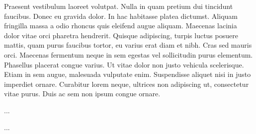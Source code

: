 \documentclass[acmtocl,acmnow]{acmtrans2m}
\begin{document}
Praesent vestibulum laoreet volutpat. Nulla in quam pretium dui tincidunt faucibus. Donec eu gravida dolor. In hac habitasse platea dictumst. Aliquam fringilla massa a odio rhoncus quis eleifend augue aliquam. Maecenas lacinia dolor vitae orci pharetra hendrerit. Quisque adipiscing, turpis luctus posuere mattis, quam purus faucibus tortor, eu varius erat diam et nibh. Cras sed mauris orci. Maecenas fermentum neque in sem egestas vel sollicitudin purus elementum. Phasellus placerat congue varius. Ut vitae dolor non justo vehicula scelerisque. Etiam in sem augue, malesuada vulputate enim. Suspendisse aliquet nisi in justo imperdiet ornare. Curabitur lorem neque, ultrices non adipiscing ut, consectetur vitae purus. Duis ac sem non ipsum congue ornare. 

\begin{thebibliography}{...}
...
\end{thebibliography}

\begin{received}
...
\end{received}
\end{document}

